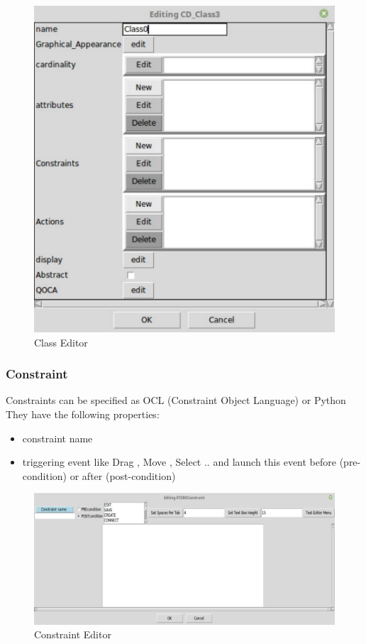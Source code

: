 \begin{figure}[th]
	\centering
		\includegraphics[scale=0.5]{Chapiter3/img/class}
	\caption{\label{fig:Class Editor}Class Editor}
\end{figure} 
\subsubsection{ Constraint }

Constraints can be specified as OCL (Constraint Object Language) or Python
They have the following properties: 
\begin{itemize}
\item  constraint name
\item  triggering event  like Drag , Move , Select ..
and launch this event before (pre-condition) or after (post-condition)
 
\end{itemize}
 

\begin{figure}[th]
	\centering
	\includegraphics{Chapiter3/img/cont}
	\caption{\label{fig:Constraint Editor}Constraint Editor}
\end{figure} 
\pagebreak
